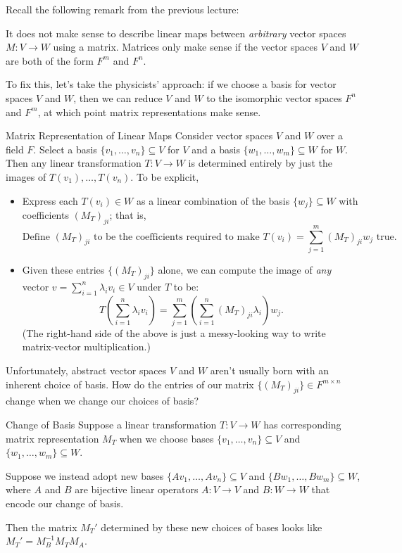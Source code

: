 Recall the following remark from the previous lecture:

\begin{remark}
    It does not make sense to describe linear maps between \emph{arbitrary} vector spaces $M: V \to W$ using a matrix.  Matrices only make sense if the vector spaces $V$ and $W$ are both of the form $F^m$ and $F^n$.
\end{remark}

To fix this, let's take the physicists' approach: if we choose a basis for vector spaces $V$ and $W$, then we can reduce $V$ and $W$ to the isomorphic vector spaces $F^n$ and $F^m$, at which point matrix representations make sense.

\begin{theorem}{Matrix Representation of Linear Maps}
    Consider vector spaces $V$ and $W$ over a field $F$.  Select a basis $\{v_1, \dots, v_n\} \subseteq V$ for $V$ and a basis $\{w_1, \dots, w_m\} \subseteq W$ for $W$.  Then any linear transformation $T: V \to W$ is determined entirely by just the images of $T(v_1), \dots, T(v_n)$.  To be explicit,
    \begin{itemize}
        \item Express each $T(v_i) \in W$ as a linear combination of the basis $\{w_j\} \subseteq W$ with coefficients $(M_T)_{ji}$; that is, \vspace{-0.2cm}
        \[ \text{Define } (M_T)_{ji} \text{ to be the coefficients required to make } T(v_i) = \sum_{j = 1}^m (M_T)_{ji} w_j \text{ true.} \] \vspace{-0.7cm}
        \item Given these entries $\{(M_T)_{ji}\}$ alone, we can compute the image of \emph{any} vector $v = \sum_{i = 1}^n \lambda_i v_i \in V$ under $T$ to be: \vspace{-0.2cm}
        \[ T\left(\sum_{i = 1}^n \lambda_i v_i \right) = \sum_{j = 1}^m \left(\sum_{i = 1}^n (M_T)_{ji} \lambda_i\right)w_j. \]
        (The right-hand side of the above is just a messy-looking way to write matrix-vector multiplication.)
    \end{itemize}
\end{theorem}

Unfortunately, abstract vector spaces $V$ and $W$ aren't usually born with an inherent choice of basis.  How do the entries of our matrix $\{(M_T)_{ji}\} \in F^{m \times n}$ change when we change our choices of basis?

\begin{theorem}{Change of Basis}
    Suppose a linear transformation $T: V \to W$ has corresponding matrix representation $M_T$ when we choose bases $\{v_1, \dots, v_n\} \subseteq V$ and $\{w_1, \dots, w_m\} \subseteq W$.
    
    Suppose we instead adopt new bases $\{Av_1, \dots, Av_n\} \subseteq V$ and $\{Bw_1, \dots, Bw_m\} \subseteq W$, where $A$ and $B$ are bijective linear operators $A: V \to V$ and $B: W \to W$ that encode our change of basis.
    
    Then the matrix $M_T'$ determined by these new choices of bases looks like $M_T' = M_{B}^{-1}M_T M_A$.
\end{theorem}

